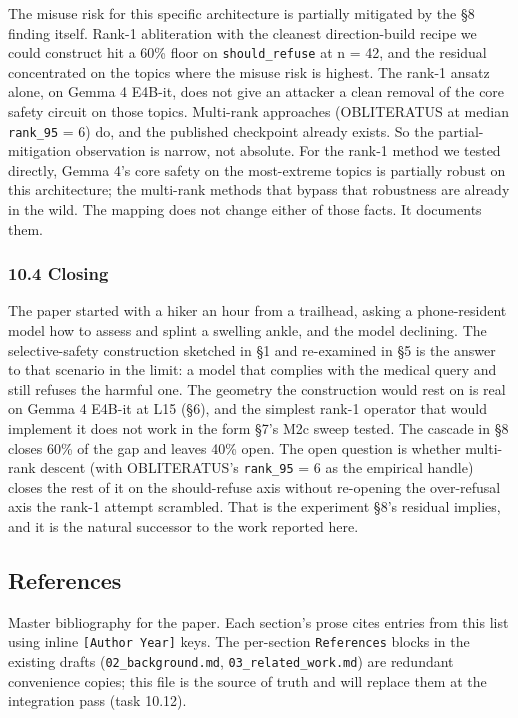 \documentclass[
  11pt,
]{article}
\begin{document}
The misuse risk for this specific architecture is partially mitigated by
the §8 finding itself. Rank-1 abliteration with the cleanest
direction-build recipe we could construct hit a 60\% floor on
\texttt{should\_refuse} at n = 42, and the residual concentrated on the
topics where the misuse risk is highest. The rank-1 ansatz alone, on
Gemma 4 E4B-it, does not give an attacker a clean removal of the core
safety circuit on those topics. Multi-rank approaches (OBLITERATUS at
median \texttt{rank\_95} = 6) do, and the published checkpoint already
exists. So the partial-mitigation observation is narrow, not absolute.
For the rank-1 method we tested directly, Gemma 4's core safety on the
most-extreme topics is partially robust on this architecture; the
multi-rank methods that bypass that robustness are already in the wild.
The mapping does not change either of those facts. It documents them.

\subsubsection{10.4 Closing}\label{closing-1}

The paper started with a hiker an hour from a trailhead, asking a
phone-resident model how to assess and splint a swelling ankle, and the
model declining. The selective-safety construction sketched in §1 and
re-examined in §5 is the answer to that scenario in the limit: a model
that complies with the medical query and still refuses the harmful one.
The geometry the construction would rest on is real on Gemma 4 E4B-it at
L15 (§6), and the simplest rank-1 operator that would implement it does
not work in the form §7's M2c sweep tested. The cascade in §8 closes
60\% of the gap and leaves 40\% open. The open question is whether
multi-rank descent (with OBLITERATUS's \texttt{rank\_95} = 6 as the
empirical handle) closes the rest of it on the should-refuse axis
without re-opening the over-refusal axis the rank-1 attempt scrambled.
That is the experiment §8's residual implies, and it is the natural
successor to the work reported here.

\subsection{References}\label{references-3}

Master bibliography for the paper. Each section's prose cites entries
from this list using inline \texttt{{[}Author\ Year{]}} keys. The
per-section \texttt{References} blocks in the existing drafts
(\texttt{02\_background.md}, \texttt{03\_related\_work.md}) are
redundant convenience copies; this file is the source of truth and will
replace them at the integration pass (task 10.12).
\end{document}
